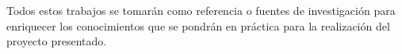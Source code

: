 Todos estos trabajos se tomarán como referencia o fuentes de investigación para enriquecer los conocimientos que se pondrán en práctica para la realización del proyecto presentado.


\noindent